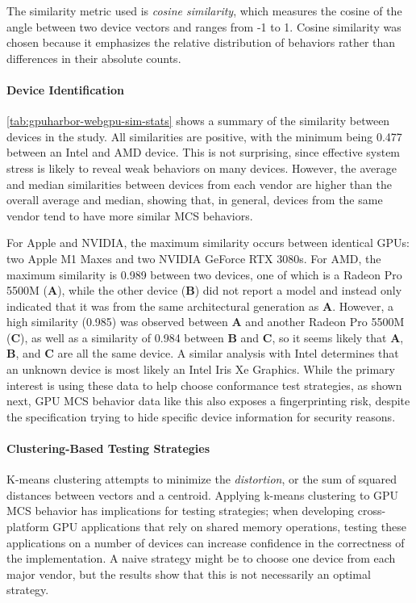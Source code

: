 The similarity metric used is \textit{cosine similarity}, which measures the cosine of the angle between two device vectors and ranges from -1 to 1. Cosine similarity was chosen because it emphasizes the relative distribution of behaviors rather than differences in their absolute counts.

 \paragraph{Device Identification} \mytablong\ref{tab:gpuharbor-webgpu-sim-stats} shows a summary of the similarity between devices in the study. All similarities are positive, with the minimum being 0.477 between an Intel and AMD device. This is not surprising, since effective system stress is likely to reveal weak behaviors on many devices. However, the average and median similarities between devices from each vendor are higher than the overall average and median, showing that, in general, devices from the same vendor tend to have more similar MCS behaviors.

 For Apple and NVIDIA, the maximum similarity occurs between identical GPUs: two Apple M1 Maxes and two NVIDIA GeForce RTX 3080s. For AMD, the maximum similarity is 0.989 between two devices, one of which is a Radeon Pro 5500M (\textbf{A}), while the other device (\textbf{B}) did not report a model and instead only indicated that it was from the same architectural generation as \textbf{A}. However, a high similarity (0.985) was observed between \textbf{A} and another Radeon Pro 5500M (\textbf{C}), as well as a similarity of 0.984 between \textbf{B} and \textbf{C}, so it seems likely that \textbf{A}, \textbf{B}, and \textbf{C} are all the same device. A similar analysis with Intel determines that an unknown device is most likely an Intel Iris Xe Graphics. While the primary interest is using these data to help choose conformance test strategies, as shown next, GPU MCS behavior data like this also exposes a fingerprinting risk, despite the specification trying to hide specific device information for security reasons.

\paragraph{Clustering-Based Testing Strategies} K-means clustering attempts to minimize the \textit{distortion}, or the sum of squared distances between vectors and a centroid. Applying k-means clustering to GPU MCS behavior has implications for testing strategies; when developing cross-platform GPU applications that rely on shared memory operations, testing these applications on a number of devices can increase confidence in the correctness of the implementation. A naive strategy might be to choose one device from each major vendor, but the results show that this is not necessarily an optimal strategy.

